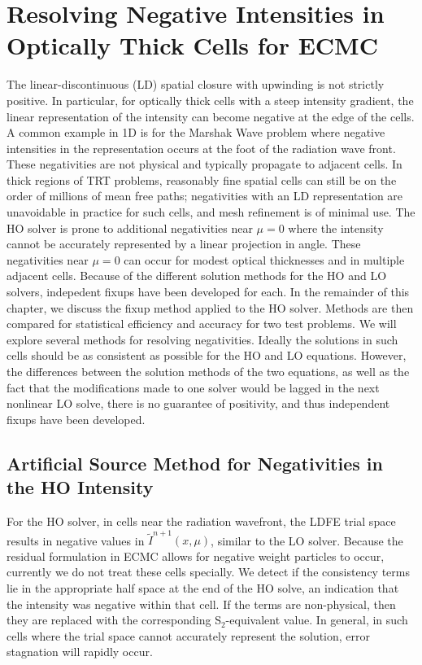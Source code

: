 

\chapter{Resolving Negative Intensities in Optically Thick Cells for ECMC}
\label{chp:negativities}

The linear-discontinuous (LD) spatial closure with upwinding is not
strictly positive.  In particular, for optically thick cells with a steep intensity
gradient, the linear representation of the intensity can become negative at the edge of the cells.
A common example in 1D is for the Marshak Wave
problem where negative
intensities in the representation occurs at the foot of the radiation wave front. These negativities are not physical and typically propagate to
adjacent cells. In thick regions of
TRT problems, reasonably fine spatial cells can still be on the order of millions of mean
free paths; negativities with an LD representation are unavoidable in practice for
such cells, and mesh refinement is of minimal use.
The HO solver is prone to additional negativities near $\mu=0$ where the intensity
cannot be accurately represented by a linear projection in angle.  These negativities near
$\mu=0$ can occur for modest optical thicknesses and in multiple adjacent cells.
Because of the different solution methods for the HO and LO solvers, indepedent fixups
have been developed for each. 
In the remainder of this chapter, we discuss the fixup method applied to the HO
solver.  Methods are then compared for statistical efficiency and accuracy for two test problems.
      We will explore several methods
for resolving negativities.  Ideally the solutions in
such cells should be as consistent as possible for the HO and LO equations.  However,
the differences between the solution methods of the two equations, as well as the
fact that the modifications made to one solver would be lagged in the next nonlinear LO solve, there
is no guarantee of positivity, and thus independent fixups have been developed.  


\section{Artificial Source Method for Negativities in the HO Intensity}

For the HO solver, in cells near the radiation wavefront, the LDFE trial space results in
negative values in $\tilde{I}^{n+1}(x,\mu)$, similar to the LO solver.  Because the residual formulation in ECMC allows for negative weight
particles to occur, currently we do not treat these cells specially.  We detect if
the consistency terms lie in the appropriate half space at the end of the HO solve,
an indication that the intensity was negative within that cell.  If the terms are non-physical, then
they are replaced with the corresponding S$_2$-equivalent value. In general,
in such cells where the trial space cannot accurately represent the solution, error stagnation will
rapidly occur. 

